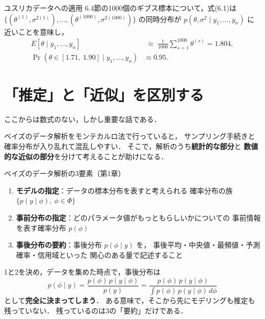 \documentclass[lualatex,ja=standard,a4paper,12pt]{bxjsarticle}
\begin{document}
\begin{exbox}{ユスリカデータへの適用}
6.4節の1000個のギブス標本について，式(6.1)は
$\{(\theta^{(1)}, \sigma^{2(1)}), \ldots, (\theta^{(1000)}, \sigma^{2(1000)})\}$
の同時分布が $p(\theta, \sigma^2 \mid y_1, \ldots, y_n)$ に近いことを意味し，
\begin{align*}
  E[\theta \mid y_1, \ldots, y_n]
    &\;\approx\; \frac{1}{1000}\sum_{s=1}^{1000} \theta^{(s)} = 1.804, \\[4pt]
  \Pr\!\left(\theta \in [1.71,\ 1.90] \mid y_1, \ldots, y_n\right) &\approx 0.95.
\end{align*}
\end{exbox}

\section{「推定」と「近似」を区別する}

ここからは数式のない，しかし重要な話である．

\medskip
ベイズのデータ解析をモンテカルロ法で行っていると，
サンプリング手続きと確率分布が入り乱れて混乱しやすい．
そこで，解析のうち\textbf{統計的な部分}と
\textbf{数値的な近似の部分}を分けて考えることが助けになる．

\begin{thmbox}{ベイズのデータ解析の3要素（第1章）}
\begin{enumerate}
  \item \textbf{モデルの指定}：データの標本分布を表すと考えられる
        確率分布の族 $\{p(y \mid \phi),\ \phi \in \Phi\}$

  \item \textbf{事前分布の指定}：どのパラメータ値がもっともらしいかについての
        事前情報を表す確率分布 $p(\phi)$

  \item \textbf{事後分布の要約}：事後分布 $p(\phi \mid y)$ を，
        事後平均・中央値・最頻値・予測確率・信用域といった
        関心のある量で記述すること
\end{enumerate}
\end{thmbox}

\noindent 1と2を決め，データを集めた時点で，事後分布は
\[
  p(\phi \mid y) = \frac{p(\phi)\,p(y \mid \phi)}{p(y)}
  = \frac{p(\phi)\,p(y \mid \phi)}{\int p(\phi)\,p(y \mid \phi)\, d\phi}
\]
として\textbf{完全に決まってしまう}．
ある意味で，そこから先にモデリングも推定も残っていない．
残っているのは3の「要約」だけである．
\end{document}
